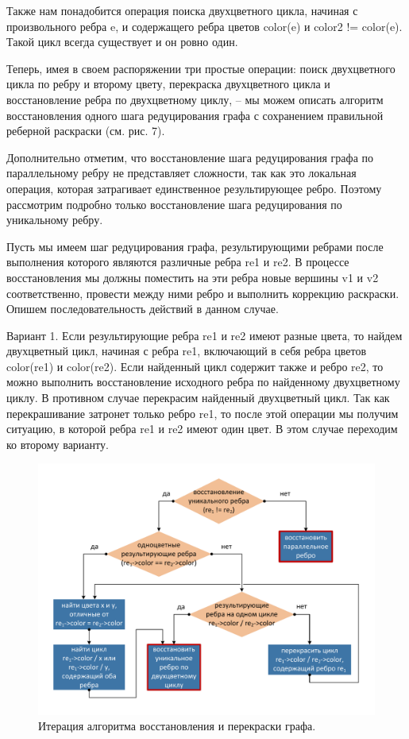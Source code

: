 Также нам понадобится операция поиска двухцветного цикла, начиная с произвольного ребра e, и содержащего ребра цветов color(e) и color2 != color(e). Такой цикл всегда существует и он ровно один.

Теперь, имея в своем распоряжении три простые операции: поиск двухцветного цикла по ребру и второму цвету, перекраска двухцветного цикла и восстановление ребра по двухцветному циклу, – мы можем описать алгоритм восстановления одного шага редуцирования графа с сохранением правильной реберной раскраски (см. рис. 7).

Дополнительно отметим, что восстановление шага редуцирования графа по параллельному ребру не представляет сложности, так как это локальная операция, которая затрагивает единственное результирующее ребро. Поэтому рассмотрим подробно только восстановление шага редуцирования по уникальному ребру.

Пусть мы имеем шаг редуцирования графа, результирующими ребрами после выполнения которого являются различные ребра re1 и re2.
В процессе восстановления мы должны поместить на эти ребра новые вершины v1 и v2 соответственно, провести между ними ребро и выполнить коррекцию раскраски. Опишем последовательность действий в данном случае.

Вариант 1. Если результирующие ребра re1 и re2 имеют разные цвета, то найдем двухцветный цикл, начиная с ребра re1, включающий в себя ребра цветов color(re1) и color(re2).
Если найденный цикл содержит также и ребро re2, то можно выполнить восстановление исходного ребра по найденному двухцветному циклу. В противном случае перекрасим найденный двухцветный цикл.
Так как перекрашивание затронет только ребро re1, то после этой операции мы получим ситуацию, в которой ребра re1 и re2 имеют один цвет. В этом случае переходим ко второму варианту.

\begin{figure}[ht]
\centering
\includegraphics[width=1.0\textwidth]{./pics/text_3_edge_coloring/7-algorithm.pdf}
\singlespacing
{}\caption{Итерация алгоритма восстановления и перекраски графа.}
\label{fig:text_3_edge_coloring_7}
\end{figure}

